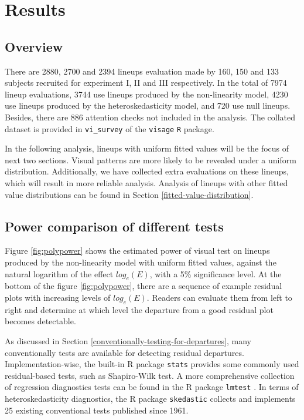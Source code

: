 \documentclass[]{interact}
\theoremstyle{plain}%
\theoremstyle{definition}
\theoremstyle{remark}
\begin{document}
\hypertarget{results}{%
\section{Results}\label{results}}

\hypertarget{overview}{%
\subsection{Overview}\label{overview}}

There are 2880, 2700 and 2394 lineups evaluation made by 160, 150 and
133 subjects recruited for experiment I, II and III respectively. In the
total of 7974 lineup evaluations, 3744 use lineups produced by the
non-linearity model, 4230 use lineups produced by the heteroskedasticity
model, and 720 use null lineups. Besides, there are 886 attention checks
not included in the analysis. The collated dataset is provided in
\texttt{vi\_survey} of the \texttt{visage} \texttt{R} package.

In the following analysis, lineups with uniform fitted values will be
the focus of next two sections. Visual patterns are more likely to be
revealed under a uniform distribution. Additionally, we have collected
extra evaluations on these lineups, which will result in more reliable
analysis. Analysis of lineups with other fitted value distributions can
be found in Section \ref{fitted-value-distribution}.

\hypertarget{power-comparison-of-different-tests}{%
\subsection{Power comparison of different
tests}\label{power-comparison-of-different-tests}}

Figure \ref{fig:polypower} shows the estimated power of visual test on
lineups produced by the non-linearity model with uniform fitted values,
against the natural logarithm of the effect \(log_e(E)\), with a 5\%
significance level. At the bottom of the figure \ref{fig:polypower},
there are a sequence of example residual plots with increasing levels of
\(log_e(E)\). Readers can evaluate them from left to right and determine
at which level the departure from a good residual plot becomes
detectable.

As discussed in Section \ref{conventionally-testing-for-departures},
many conventionally tests are available for detecting residual
departures. Implementation-wise, the built-in R package \texttt{stats}
provides some commonly used residual-based tests, such as Shapiro-Wilk
test. A more comprehensive collection of regression diagnostics tests
can be found in the R package \texttt{lmtest} \citep{lmtest}. In terms
of heteroskedasticity diagnostics, the R package \texttt{skedastic}
\citep{skedastic} collects and implements 25 existing conventional tests
published since 1961.
\end{document}

